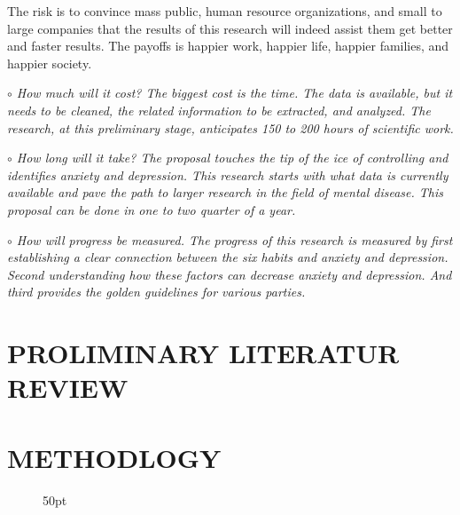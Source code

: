 \documentclass[letterpaper, 10 pt, conference]{ieeeconf}  %
\begin{document}
\textnormal{
The risk is to convince mass public, human resource organizations, and small 
to large companies that the results of this research will indeed assist them 
get better and faster results. The payoffs is happier work, happier life, 
happier families, and happier society.  
}
\par\noindent\it{$\circ$ How much will it cost?}\newline
\textnormal{
The biggest cost is the time. The data is available, but it 
needs to be cleaned, the related information to be extracted, and analyzed. 
The research, at this preliminary stage, anticipates 150 to 200 hours of scientific work. 
}
\par\noindent\it{$\circ$ How long will it take?}\newline
\textnormal{
The proposal touches the tip of the ice of controlling and identifies anxiety 
and depression. This research starts with what data is currently available 
and pave the path to larger research in the field of mental disease. This 
proposal can be done in one to two quarter of a year.
}
\par\noindent\it{$\circ$ How will progress be measured.}\newline
\textnormal{
The progress of this research is measured by first establishing a clear connection 
between the six habits and anxiety and depression. Second understanding how these 
factors can decrease anxiety and depression. And third provides the golden 
guidelines for various parties.
}
\section{PROLIMINARY LITERATUR REVIEW}

\section{METHODLOGY}


%
\clearpage 
\begin{figure}[hbt!]
\centering
        
        \addvspace{250pt}
        \hfill\hfill{50pt}
\label{fig:schedule}
\end{figure}

\clearpage 



\end{document}
